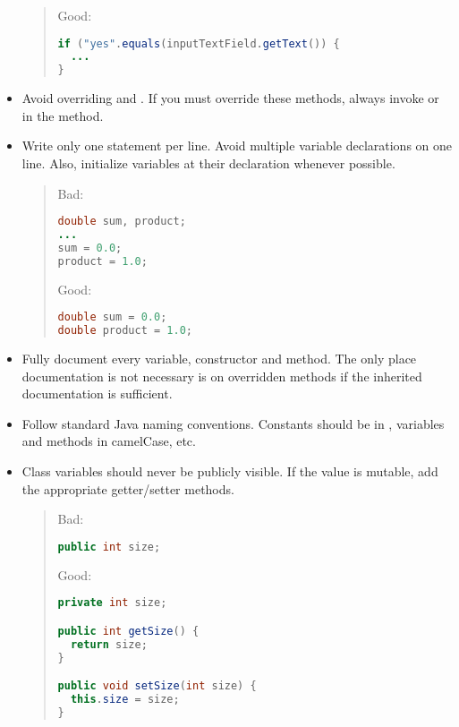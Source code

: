 \begin{itemize}
\begin{quote}
      Good:
      \begin{lstlisting}[language=Java]
if ("yes".equals(inputTextField.getText()) {
  ...
}
      \end{lstlisting}
    \end{quote}
  
  \item Avoid overriding  and .  If you must override these methods, always invoke  or  in the method.

  \item Write only one statement per line.  Avoid multiple variable declarations on one line.  Also, initialize variables at their declaration whenever possible.
    \begin{quote}
      Bad:
      \begin{lstlisting}[language=Java]
double sum, product;
...
sum = 0.0;
product = 1.0;
      \end{lstlisting}
      
      Good:
      \begin{lstlisting}[language=Java]
double sum = 0.0;
double product = 1.0;
      \end{lstlisting}
    \end{quote}
  
  \item Fully document every variable, constructor and method.  The only place documentation is not necessary is on overridden methods if the inherited documentation is sufficient.

  \item Follow standard Java naming conventions.  Constants should be in , variables and methods in camelCase, etc.

  \item Class variables should never be publicly visible.  If the value is mutable, add the appropriate getter/setter methods.
    \begin{quote}
      Bad:
      \begin{lstlisting}[language=Java]
public int size;
      \end{lstlisting}
      
      Good:
      \begin{lstlisting}[language=Java]
private int size;

public int getSize() {
  return size;
}

public void setSize(int size) {
  this.size = size;
}
      \end{lstlisting}
    \end{quote}
\end{itemize}

